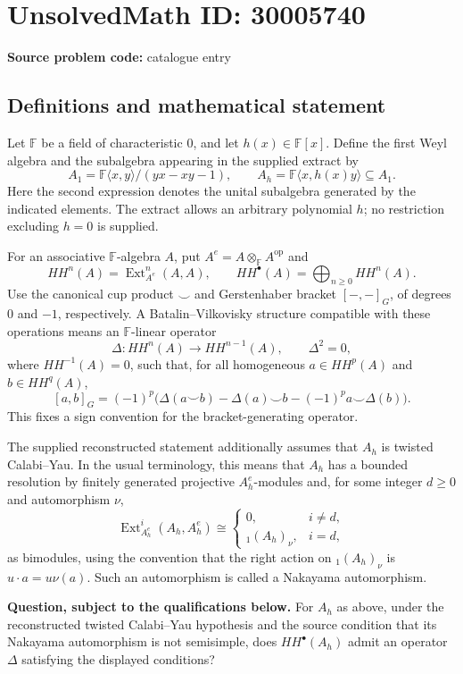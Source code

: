 \documentclass[11pt]{article}
\newcommand{\F}{\mathbb{F}}
\begin{document}
\section*{UnsolvedMath ID: 30005740}
\textbf{Source problem code:} catalogue entry
\subsection{Definitions and mathematical statement}
Let \(\F\) be a field of characteristic \(0\), and let \(h(x)\in\F[x]\). Define the first Weyl algebra and the subalgebra appearing in the supplied extract by
\[
A_1=\F\langle x,y\rangle/(yx-xy-1),\qquad
A_h=\F\langle x,h(x)y\rangle\subseteq A_1.
\]
Here the second expression denotes the unital subalgebra generated by the indicated elements. The extract allows an arbitrary polynomial \(h\); no restriction excluding \(h=0\) is supplied.

For an associative \(\F\)-algebra \(A\), put \(A^e=A\otimes_{\F}A^{\mathrm{op}}\) and
\[
HH^n(A)=\operatorname{Ext}_{A^e}^n(A,A),\qquad
HH^\bullet(A)=\bigoplus_{n\geq0}HH^n(A).
\]
Use the canonical cup product \(\smile\) and Gerstenhaber bracket \([-,-]_G\), of degrees \(0\) and \(-1\), respectively. A Batalin--Vilkovisky structure compatible with these operations means an \(\F\)-linear operator
\[
\Delta:HH^n(A)\longrightarrow HH^{n-1}(A),\qquad \Delta^2=0,
\]
where \(HH^{-1}(A)=0\), such that, for all homogeneous \(a\in HH^p(A)\) and \(b\in HH^q(A)\),
\[
[a,b]_G=(-1)^p\bigl(\Delta(a\smile b)-\Delta(a)\smile b-(-1)^p a\smile\Delta(b)\bigr).
\]
This fixes a sign convention for the bracket-generating operator.

The supplied reconstructed statement additionally assumes that \(A_h\) is twisted Calabi--Yau. In the usual terminology, this means that \(A_h\) has a bounded resolution by finitely generated projective \(A_h^e\)-modules and, for some integer \(d\geq0\) and automorphism \(\nu\),
\[
\operatorname{Ext}_{A_h^e}^{i}(A_h,A_h^e)\cong
\begin{cases}
0,&i\ne d,\\
{}_1(A_h)_{\nu},&i=d,
\end{cases}
\]
as bimodules, using the convention that the right action on \({}_1(A_h)_{\nu}\) is \(u\cdot a=u\nu(a)\). Such an automorphism is called a Nakayama automorphism.

\textbf{Question, subject to the qualifications below.} For \(A_h\) as above, under the reconstructed twisted Calabi--Yau hypothesis and the source condition that its Nakayama automorphism is not semisimple, does \(HH^\bullet(A_h)\) admit an operator \(\Delta\) satisfying the displayed conditions?
\end{document}
